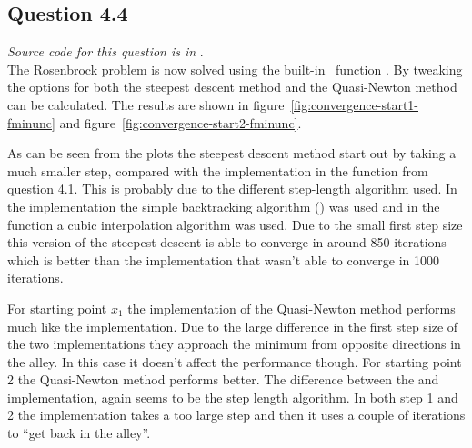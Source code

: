 \subsection*{Question 4.4}
\textit{Source code for this question is in }. \\
The Rosenbrock problem is now solved using the built-in \matlab\ function . By tweaking the options for  both the steepest descent method and the Quasi-Newton method can be calculated. The results are shown in figure~\ref{fig:convergence-start1-fminunc} and figure~\ref{fig:convergence-start2-fminunc}. \par
As can be seen from the plots the steepest descent method start out by taking a much smaller step, compared with the implementation in the  function from question 4.1. This is probably due to the different step-length algorithm used. In the  implementation the simple backtracking algorithm (\cite[algorithm 3.1]{nocedal06}) was used and in the  function a cubic interpolation algorithm was used. Due to the small first step size this version of the steepest descent is able to converge in around 850 iterations which is better than the  implementation that wasn't able to converge in 1000 iterations. \par
For starting point $x_1$ the  implementation of the Quasi-Newton method performs much like the  implementation. Due to the large difference in the first step size of the two implementations they approach the minimum from opposite directions in the alley. In this case it doesn't affect the performance though. For starting point 2 the  Quasi-Newton method performs better. The difference between the  and  implementation, again seems to be the step length algorithm. In both step 1 and 2 the  implementation takes a too large step and then it uses a couple of iterations to ``get back in the alley''.

